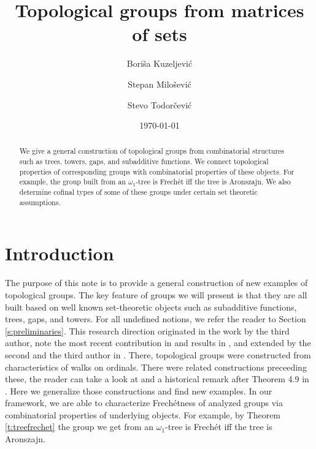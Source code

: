 \documentclass{amsart}
\author[B. Kuzeljevi\'c]{Bori\v sa Kuzeljevi\'c}
\author[S. Milo\v sevi\'c]{Stepan Milo\v sevi\'c}
\author[S. Todor\v{c}evi\'{c}]{Stevo Todor\v{c}evi\'{c}}
\title{Topological groups from matrices of sets}
\date{\today}
\theoremstyle{plain}
\theoremstyle{definition}
\numberwithin{equation}{section}
\renewcommand{\o}{\omega}
\begin{document}
	\begin{abstract}
		We give a general construction of topological groups from combinatorial structures such as trees, towers, gaps, and subadditive functions.
		We connect topological properties of corresponding groups with combinatorial properties of these objects.
		For example, the group built from an $\o_1$-tree is Frech\'et iff the tree is Aronszajn.
		We also determine cofinal types of some of these groups under certain set theoretic assumptions.
	\end{abstract}

\maketitle

\section{Introduction}

The purpose of this note is to provide a general construction of new examples of topological groups.
The key feature of groups we will present is that they are all built based on well known set-theoretic objects such as subadditive functions, trees, gaps, and towers.
For all undefined notions, we refer the reader to Section \ref{s:preliminaries}.
This research direction originated in the work by the third author, note the most recent contribution in \cite[Theorem 4.9]{pid_fund} and results in \cite{walks}, and extended by the second and the third author in \cite{mt_walks}.
There, topological groups were constructed from characteristics of walks on ordinals.
There were related constructions preceeding these, the reader can take a look at \cite{dw,gt,cs,szept} and a historical remark after Theorem 4.9 in \cite{pid_fund}.
Here we generalize those constructions and find new examples.
In our framework, we are able to characterize Frech\'etness of analyzed groups via combinatorial properties of underlying objects.
For example, by Theorem \ref{t:treefrechet} the group we get from an $\o_1$-tree is Frech\'et iff the tree is Aronszajn.
\end{document}
